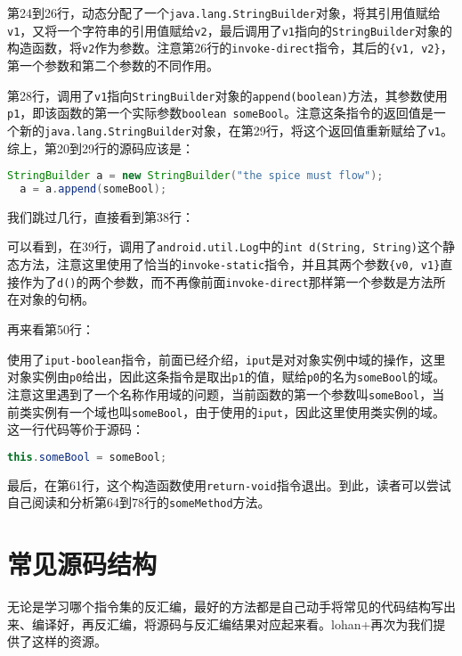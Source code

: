 第24到26行，动态分配了一个\lstinline!java.lang.StringBuilder!对象，将其引用值赋给\lstinline!v1!，又将一个字符串的引用值赋给\lstinline!v2!，最后调用了\lstinline!v1!指向的\lstinline!StringBuilder!对象的构造函数，将\lstinline!v2!作为参数。注意第26行的\lstinline!invoke-direct!指令，其后的\lstinline!{v1, v2}!，第一个参数和第二个参数的不同作用。


第28行，调用了\lstinline!v1!指向\lstinline!StringBuilder!对象的\lstinline!append(boolean)!方法，其参数使用\lstinline!p1!，即该函数的第一个实际参数\lstinline!boolean someBool!。注意这条指令的返回值是一个新的\lstinline!java.lang.StringBuilder!对象，在第29行，将这个返回值重新赋给了\lstinline!v1!。综上，第20到29行的源码应该是：

\begin{lstlisting}[language=java, numbers=none]
  StringBuilder a = new StringBuilder("the spice must flow");
  a = a.append(someBool);
\end{lstlisting}

我们跳过几行，直接看到第38行：


可以看到，在39行，调用了\lstinline!android.util.Log!中的\lstinline!int d(String, String)!这个静态方法，注意这里使用了恰当的\lstinline!invoke-static!指令，并且其两个参数\lstinline!{v0, v1}!直接作为了\lstinline!d()!的两个参数，而不再像前面\lstinline!invoke-direct!那样第一个参数是方法所在对象的句柄。

再来看第50行：

使用了\lstinline!iput-boolean!指令，前面已经介绍，\lstinline!iput!是对对象实例中域的操作，这里对象实例由\lstinline!p0!给出，因此这条指令是取出\lstinline!p1!的值，赋给\lstinline!p0!的名为\lstinline!someBool!的域。注意这里遇到了一个名称作用域的问题，当前函数的第一个参数叫\lstinline!someBool!，当前类实例有一个域也叫\lstinline!someBool!，由于使用的\lstinline!iput!，因此这里使用类实例的域。这一行代码等价于源码：
\begin{lstlisting}[language=java, numbers=none]
  this.someBool = someBool;
\end{lstlisting}

最后，在第61行，这个构造函数使用\lstinline!return-void!指令退出。到此，读者可以尝试自己阅读和分析第64到78行的\lstinline!someMethod!方法。

\section{常见源码结构}
无论是学习哪个指令集的反汇编，最好的方法都是自己动手将常见的代码结构写出来、编译好，再反汇编，将源码与反汇编结果对应起来看。lohan+再次为我们提供了这样的资源。

